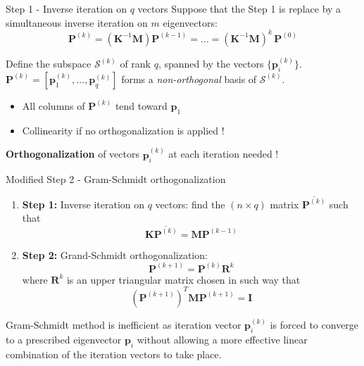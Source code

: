 \documentclass[aspectratio=169]{beamer}
\begin{document}
\begin{frame}{Step 1 - Inverse iteration on \( q \) vectors}
  Suppose that the Step 1 is replace by a simultaneous inverse iteration on \( m \) eigenvectors:
  \[
    \mathbf P^{(k)} = (\mathbf K^{-1}\mathbf M)\mathbf P^{(k-1)}=\dots = (\mathbf K^{-1}\mathbf M)^k\, \mathbf P^{(0)}
  \]
  \vspace{-0.5cm}
  \begin{block}{}
    Define the subspace \( \mathcal S^{(k)} \) of rank \( q \), spanned by the vectors \( \{\mathbf p_i^{(k)}\} \).  $\mathbf  P^{(k)}=[\mathbf p^{(k)}_1,\dots,\mathbf p^{(k)}_q]$ forms a \emph{non-orthogonal} basis of \( \mathcal S^{(k)} \).
  \end{block}
  \begin{itemize}
    \item[\XSolidBrush] All columns of \(\mathbf  P^{(k)} \) tend toward \( \mathbf  p_1 \)
    \item[\XSolidBrush]  Collinearity if no orthogonalization is applied !
  \end{itemize}

  \begin{tcolorbox}[colback=darkred!10,colframe=darkred!40!black]
    \begin{center}
      \textbf{Orthogonalization} of vectors \(\mathbf p_i^{(k)} \) at each iteration needed !
    \end{center}
  \end{tcolorbox}
\end{frame}

\begin{frame}{Modified Step 2 - Gram-Schmidt orthogonalization}
  \begin{enumerate}
    \item \textbf{Step 1:} Inverse iteration on \( q \) vectors: find the $(n\times q)$ matrix $\overline{\mathbf P^{(k)}}$ such that
          \[
            \mathbf K\overline{\mathbf P^{(k)}} = \mathbf M\mathbf P^{(k-1)}
          \]
    \item \textbf{Step 2:} Grand-Schmidt orthogonalization:
          $$\mathbf P^{(k+1)}=\mathbf P^{(k)}\mathbf R^{k}$$
          where $\mathbf R^{k}$ is an upper triangular matrix chosen in such way that
          $$(\mathbf P^{(k+1)})^T\mathbf M \mathbf P^{(k+1)} = \mathbf I$$
  \end{enumerate}
  \begin{block}{}
    Gram-Schmidt method is inefficient as iteration vector $\mathbf p_i^{(k)}$ is forced to converge to a prescribed eigenvector $\mathbf p_i$ without allowing a more effective linear combination of the iteration vectors to take place.
  \end{block}
\end{frame}
\end{document}
